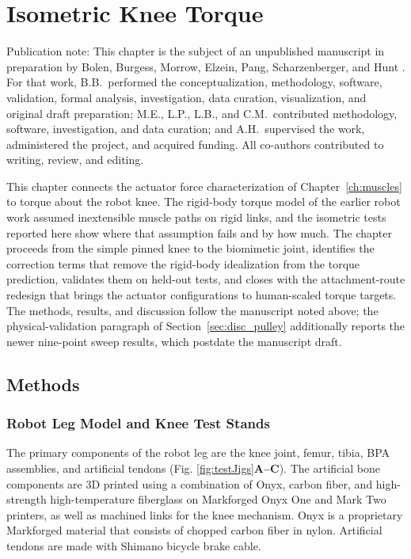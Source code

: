 \chapter{Isometric Knee Torque}\label{ch:torque}\label{ch:results}
\graphicspath{{../Figures/30-torque/}{figs/30-torque/}}

{\doublespacing\normalsize\upshape
\noindent Publication note: This chapter is the subject of an unpublished manuscript in preparation by Bolen, Burgess, Morrow, Elzein, Pang, Scharzenberger, and Hunt \citep{bolen_isometric_2025}. For that work, B.B.\ performed the conceptualization, methodology, software, validation, formal analysis, investigation, data curation, visualization, and original draft preparation; M.E., L.P., L.B., and C.M.\ contributed methodology, software, investigation, and data curation; and A.H.\ supervised the work, administered the project, and acquired funding. All co-authors contributed to writing, review, and editing.\par}

This chapter connects the actuator force characterization of Chapter~\ref{ch:muscles} to torque about the robot knee. The rigid-body torque model of the earlier robot work assumed inextensible muscle paths on rigid links, and the isometric tests reported here show where that assumption fails and by how much. The chapter proceeds from the simple pinned knee to the biomimetic joint, identifies the correction terms that remove the rigid-body idealization from the torque prediction, validates them on held-out tests, and closes with the attachment-route redesign that brings the actuator configurations to human-scaled torque targets. The methods, results, and discussion follow the manuscript noted above; the physical-validation paragraph of Section~\ref{sec:disc_pulley} additionally reports the newer nine-point sweep results, which postdate the manuscript draft.

\section{Methods}

\subsection{Robot Leg Model and Knee Test Stands}\label{sec:robot_model}


The primary components of the robot leg are the knee joint, femur, tibia, BPA assemblies, and artificial tendons (Fig. \ref{fig:testJigs}\textbf{A--C}). The artificial bone components are 3D printed using a combination of Onyx, carbon fiber, and high-strength high-temperature fiberglass on Markforged Onyx One and Mark Two printers, as well as machined links for the knee mechanism. Onyx is a proprietary Markforged material that consists of chopped carbon fiber in nylon. Artificial tendons are made with Shimano bicycle brake cable.

